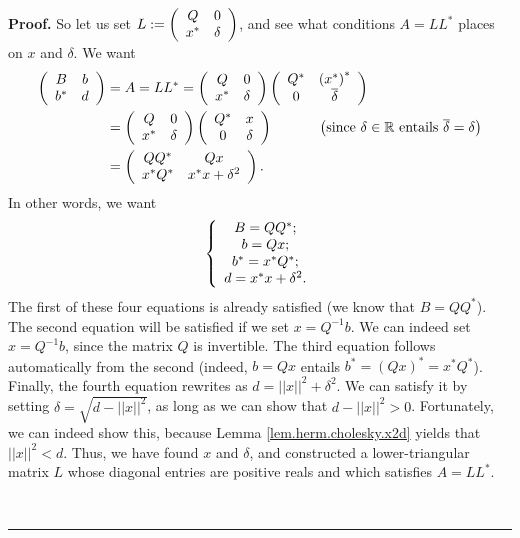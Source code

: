 \documentclass[numbers=enddot,12pt,final,onecolumn,notitlepage]{scrartcl}%
\numberwithin{exer}{subsection}
\theoremstyle{definition}
\newenvironment{proof}[1][Proof]{\noindent\textbf{#1.} }{\ \rule{0.5em}{0.5em}}
\begin{document}
\begin{proof}
So let us set $L:=\left(
\begin{array}
[c]{cc}%
Q & 0\\
x^{\ast} & \delta
\end{array}
\right)  $, and see what conditions $A=LL^{\ast}$ places on $x$ and $\delta$.
We want%
\begin{align*}
\left(
\begin{array}
[c]{cc}%
B & b\\
b^{\ast} & d
\end{array}
\right)   &  =A=LL^{\ast}=\left(
\begin{array}
[c]{cc}%
Q & 0\\
x^{\ast} & \delta
\end{array}
\right)  \left(
\begin{array}
[c]{cc}%
Q^{\ast} & \left(  x^{\ast}\right)  ^{\ast}\\
0 & \overline{\delta}%
\end{array}
\right) \\
&  =\left(
\begin{array}
[c]{cc}%
Q & 0\\
x^{\ast} & \delta
\end{array}
\right)  \left(
\begin{array}
[c]{cc}%
Q^{\ast} & x\\
0 & \delta
\end{array}
\right)  \ \ \ \ \ \ \ \ \ \ \left(  \text{since }\delta\in\mathbb{R}\text{
entails }\overline{\delta}=\delta\right) \\
&  =\left(
\begin{array}
[c]{cc}%
QQ^{\ast} & Qx\\
x^{\ast}Q^{\ast} & x^{\ast}x+\delta^{2}%
\end{array}
\right)  .
\end{align*}
In other words, we want%
\[
\left\{
\begin{array}
[c]{c}%
B=QQ^{\ast};\\
b=Qx;\\
b^{\ast}=x^{\ast}Q^{\ast};\\
d=x^{\ast}x+\delta^{2}.
\end{array}
\right.
\]
The first of these four equations is already satisfied (we know that
$B=QQ^{\ast}$). The second equation will be satisfied if we set $x=Q^{-1}b$.
We can indeed set $x=Q^{-1}b$, since the matrix $Q$ is invertible. The third
equation follows automatically from the second (indeed, $b=Qx$ entails
$b^{\ast}=\left(  Qx\right)  ^{\ast}=x^{\ast}Q^{\ast}$). Finally, the fourth
equation rewrites as $d=\left\vert \left\vert x\right\vert \right\vert
^{2}+\delta^{2}$. We can satisfy it by setting $\delta=\sqrt{d-\left\vert
\left\vert x\right\vert \right\vert ^{2}}$, as long as we can show that
$d-\left\vert \left\vert x\right\vert \right\vert ^{2}>0$. Fortunately, we can
indeed show this, because Lemma \ref{lem.herm.cholesky.x2d} yields that
$\left\vert \left\vert x\right\vert \right\vert ^{2}<d$. Thus, we have found
$x$ and $\delta$, and constructed a lower-triangular matrix $L$ whose diagonal
entries are positive reals and which satisfies $A=LL^{\ast}$.


\end{proof}
\end{document}
